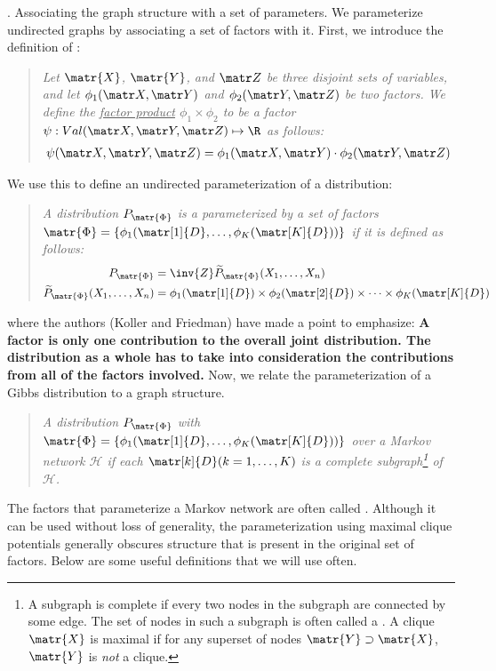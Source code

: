 \documentclass[11pt]{article}
\newcommand\myspace[1][]{\vspace{#1\bigskipamount}}
\newcommand\p{\Needspace{10\baselineskip} \noindent}
\begin{document}
\myspace
\p {}. Associating the graph structure with a set of parameters. We parameterize undirected graphs by associating a set of factors with it. First, we introduce the definition of :
\vspace{-0.5em}
\begin{quote}
	{\itshape Let $\matr{X}$, $\matr{Y}$, and $\matr Z$ be three disjoint sets of variables, and let $\phi_1(\matr X, \matr Y)$ and $\phi_2(\matr Y, \matr Z)$ be two factors. We define the \underline{factor product} $\phi_1 \times \phi_2$ to be a factor $\psi: Val(\matr X, \matr Y, \matr Z) \mapsto \R$ as follows:
		\begin{align}
			\psi(\matr X, \matr Y, \matr Z) = \phi_1(\matr X, \matr Y) \cdot \phi_2(\matr Y, \matr Z)
		\end{align}
	}
\end{quote}
We use this to define an undirected parameterization of a distribution:
\vspace{-1em}
\begin{quote}
	{\itshape A distribution $P_{\matr{\Phi}}$ is a  parameterized by a set of factors $\matr{\Phi} = \{\phi_1(\matr[1]{D}, \ldots, \phi_K(\matr[K]{D}) )\}$ if it is defined as follows:
		\begin{align}
			P_{\matr{\Phi}} &= \inv{Z} \widetilde{P}_{\matr{\Phi}}(X_1, \ldots, X_n) \\
			 \widetilde{P}_{\matr{\Phi}}(X_1, \ldots, X_n) &= \phi_1(\matr[1]{D}) \times \phi_2(\matr[2]{D}) \times \cdots \times \phi_K(\matr[K]{D})
		\end{align}
	}
\end{quote}
where the authors (Koller and Friedman) have made a point to emphasize: \textbf{A factor is only one contribution to the overall joint distribution. The distribution as a whole has to take into consideration the contributions from all of the factors involved.} Now, we relate the parameterization of a Gibbs distribution to a graph structure.
\vspace{-0.5em}
\begin{quote}
	{\itshape A distribution $P_{\matr{\Phi}}$ with $\matr{\Phi} = \{\phi_1(\matr[1]{D}, \ldots, \phi_K(\matr[K]{D}) )\}$  over a Markov network $\mathcal{H}$ if each $\matr[k]{D} (k = 1, \ldots, K)$ is a complete subgraph\footnote{A subgraph is complete if every two nodes in the subgraph are connected by some edge. The set of nodes in such a subgraph is often called a . A clique $\matr{X}$ is maximal if for any superset of nodes $\matr{Y} \supset \matr{X}$, $\matr{Y}$ is \textit{not} a clique.} of $\mathcal{H}$.
	}
\end{quote}
The factors that parameterize a Markov network are often called . Although it can be used without loss of generality, the parameterization using maximal clique potentials generally obscures structure that is present in the original set of factors. Below are some useful definitions that we will use often. \\
\end{document}
